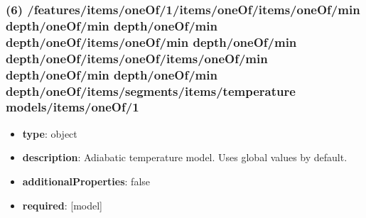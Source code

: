 \subsubsection{(6) /features/items/oneOf/1/items/oneOf/items/oneOf/min depth/oneOf/min depth/oneOf/min depth/oneOf/items/oneOf/min depth/oneOf/min depth/oneOf/items/oneOf/items/oneOf/min depth/oneOf/min depth/oneOf/min depth/oneOf/items/segments/items/temperature models/items/oneOf/1}
\begin{itemize}[leftmargin=6em]\item {\bf type}: object
\item {\bf description}: Adiabatic temperature model. Uses global values by default.
\item {\bf additionalProperties}: false
\item {\bf required}: [model]\end{itemize}
